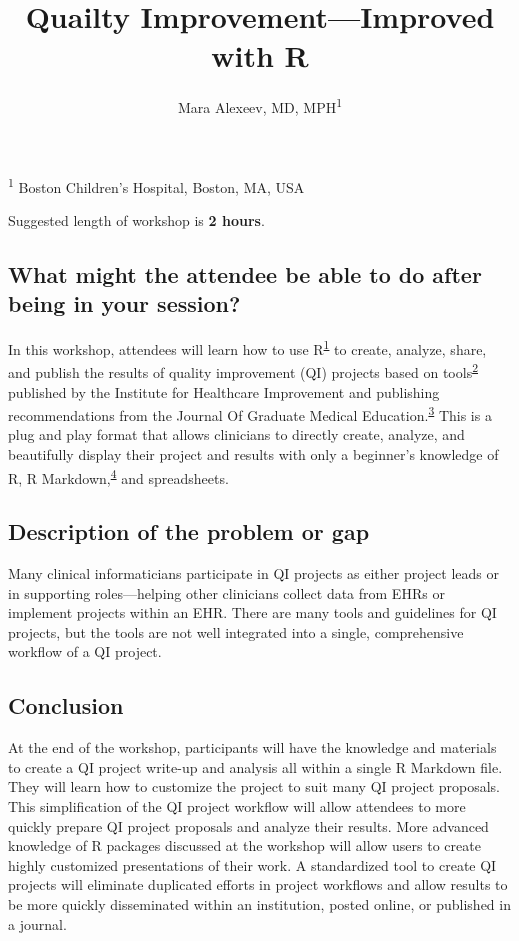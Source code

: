\documentclass[
]{article}
\title{Quailty Improvement---Improved with R}
\author{Mara Alexeev, MD, MPH\textsuperscript{1}}
\date{}
\begin{document}
\maketitle

\textsuperscript{1} Boston Children's Hospital, Boston, MA, USA

Suggested length of workshop is \textbf{2 hours}.

\hypertarget{what-might-the-attendee-be-able-to-do-after-being-in-your-session}{%
\subsection{What might the attendee be able to do after being in your session?}\label{what-might-the-attendee-be-able-to-do-after-being-in-your-session}}

In this workshop, attendees will learn how to use R\textsuperscript{\protect\hyperlink{ref-R-base}{1}} to create, analyze, share, and publish the results of quality improvement (QI) projects based on tools\textsuperscript{\protect\hyperlink{ref-noauthor_quality_2017}{2}} published by the Institute for Healthcare Improvement and publishing recommendations from the Journal Of Graduate Medical Education.\textsuperscript{\protect\hyperlink{ref-wong_how_2016}{3}} This is a plug and play format that allows clinicians to directly create, analyze, and beautifully display their project and results with only a beginner's knowledge of R, R Markdown,\textsuperscript{\protect\hyperlink{ref-R-rmarkdown}{4}} and spreadsheets.

\hypertarget{description-of-the-problem-or-gap}{%
\subsection{Description of the problem or gap}\label{description-of-the-problem-or-gap}}

Many clinical informaticians participate in QI projects as either project leads or in supporting roles---helping other clinicians collect data from EHRs or implement projects within an EHR. There are many tools and guidelines for QI projects, but the tools are not well integrated into a single, comprehensive workflow of a QI project.

\hypertarget{conclusion}{%
\subsection{Conclusion}\label{conclusion}}

At the end of the workshop, participants will have the knowledge and materials to create a QI project write-up and analysis all within a single R Markdown file. They will learn how to customize the project to suit many QI project proposals. This simplification of the QI project workflow will allow attendees to more quickly prepare QI project proposals and analyze their results. More advanced knowledge of R packages discussed at the workshop will allow users to create highly customized presentations of their work.
A standardized tool to create QI projects will eliminate duplicated efforts in project workflows and allow results to be more quickly disseminated within an institution, posted online, or published in a journal.
\end{document}
